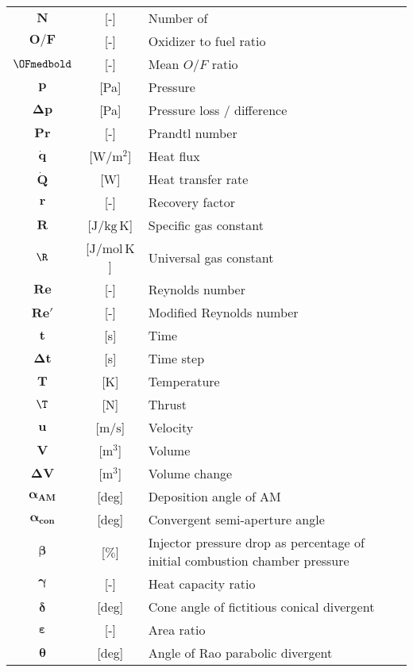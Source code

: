 \begin{multicols}{2}
{\begin{xltabular}{\linewidth}{cc>{\raggedright\arraybackslash}X}
		$\boldsymbol{N}$ & [-] & Number of \\
		$\boldsymbol{O/F}$ & [-] & Oxidizer to fuel ratio \\
		$\OFmedbold$ & [-] & Mean $O/F$ ratio \\ 
		$\boldsymbol{p}$ & [Pa] & Pressure \\
		$\boldsymbol{\Delta p}$ & [Pa] & Pressure loss / difference \\
		$\boldsymbol{Pr}$ & [-] & Prandtl number \\
		$\boldsymbol{\dot{q}}$ & [$\textrm{W} / \textrm{m}^2$] & Heat flux \\
		$\boldsymbol{\dot{Q}}$ & [W] & Heat transfer rate \\
		$\boldsymbol{r}$ & [-] & Recovery factor \\
		$\boldsymbol{R}$ & [$\textrm{J} / \textrm{kg} \, \textrm{K}$] & Specific gas constant \\
		$\boldsymbol{\R}$ & [$\textrm{J} / \textrm{mol} \, \textrm{K}$] & Universal gas constant \\
		$\boldsymbol{Re}$ & [-] & Reynolds number \\
		$\boldsymbol{Re'}$ & [-] & Modified Reynolds number \\
		$\boldsymbol{t}$ & [s] & Time \\
		$\boldsymbol{\Delta t}$ & [s] & Time step \\
		$\boldsymbol{T}$ & [K] & Temperature \\
		$\boldsymbol{\T}$ & [N] & Thrust \\
		$\boldsymbol{u}$ & [$\textrm{m} / \textrm{s}$] & Velocity \\
		$\boldsymbol{V}$ & [$\textrm{m}^3$] & Volume \\
		$\boldsymbol{\Delta V}$ & [$\textrm{m}^3$] & Volume change \\
		$\boldsymbol{\alpha_{AM}}$ & [deg] & Deposition angle of AM \\
		$\boldsymbol{\alpha_{con}}$ & [deg] & Convergent semi-aperture angle \\
		$\boldsymbol{\beta}$ & [$\%$] & Injector pressure drop as percentage of initial combustion chamber pressure \\ 
		$\boldsymbol{\gamma}$ & [-] & Heat capacity ratio \\
		$\boldsymbol{\delta}$ & [deg] & Cone angle of fictitious conical divergent \\
		$\boldsymbol{\varepsilon}$ & [-] & Area ratio \\
		$\boldsymbol{\theta}$ & [deg] & Angle of Rao parabolic divergent \\

\end{xltabular}}
\end{multicols}
